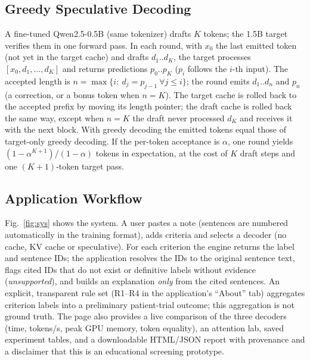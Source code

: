 \documentclass[conference]{IEEEtran}
\begin{document}
\subsection{Greedy Speculative Decoding}
A fine-tuned Qwen2.5-0.5B (same tokenizer) drafts $K$ tokens; the 1.5B target verifies them in one forward pass. In each round, with $x_0$ the last emitted token (not yet in the target cache) and drafts $d_1..d_K$, the target processes $[x_0,d_1,\dots,d_K]$ and returns predictions $p_0..p_K$ ($p_i$ follows the $i$-th input). The accepted length is $n=\max\{i:\ d_{j}=p_{j-1}\ \forall j\le i\}$; the round emits $d_1..d_n$ and $p_n$ (a correction, or a bonus token when $n{=}K$). The target cache is rolled back to the accepted prefix by moving its length pointer; the draft cache is rolled back the same way, except when $n{=}K$ the draft never processed $d_K$ and receives it with the next block. With greedy decoding the emitted tokens equal those of target-only greedy decoding. If the per-token acceptance is $\alpha$, one round yields $(1-\alpha^{K+1})/(1-\alpha)$ tokens in expectation, at the cost of $K$ draft steps and one $(K{+}1)$-token target pass.

\subsection{Application Workflow}
Fig.~\ref{fig:sys} shows the system. A user pastes a note (sentences are numbered automatically in the training format), adds criteria and selects a decoder (no cache, KV cache or speculative). For each criterion the engine returns the label and sentence IDs; the application resolves the IDs to the original sentence text, flags cited IDs that do not exist or definitive labels without evidence (\emph{unsupported}), and builds an explanation \emph{only} from the cited sentences. An explicit, transparent rule set (R1--R4 in the application's ``About'' tab) aggregates criterion labels into a preliminary patient-trial outcome; this aggregation is not ground truth. The page also provides a live comparison of the three decoders (time, tokens/s, peak GPU memory, token equality), an attention lab, saved experiment tables, and a downloadable HTML/JSON report with provenance and a disclaimer that this is an educational screening prototype.
\end{document}
